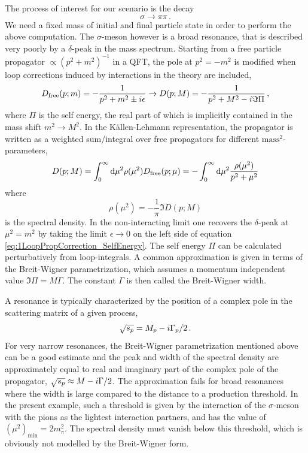 The process of interest for our scenario is the decay
\begin{equation}
    \sigma\to\pi\pi\,.
\end{equation}
We need a fixed mass of initial and final particle state in order to perform the above computation. The $\sigma$-meson however is a broad resonance, that is described very poorly by a $\delta$-peak in the mass spectrum. Starting from a free particle propagator ${\propto(p^2+m^2)^{-1}}$ in a QFT, the pole at ${p^2=-m^2}$ is modified when loop corrections induced by interactions in the theory are included,
\begin{equation}
    D_{\text{free}}(p;m)=-\frac{1}{p^2+m^2\pm{i}\epsilon}\to D(p;M)=-\frac{1}{p^2+M^2-{i}\Im\Pi}\,,
    \label{eq:1LoopPropCorrection_SelfEnergy}
\end{equation}
where $\Pi$ is the self energy, the real part of which is implicitly contained in the mass shift ${m^2\to M^2}$. In the Källen-Lehmann representation, the propagator is written as a weighted sum/integral over free propagators for different $\text{mass}^2$-parameters,
\begin{equation}
    D(p;M)=\int_0^\infty\text{d}\mu^2\rho(\mu^2)D_{\text{free}}(p;\mu)=-\int_0^\infty\text{d}\mu^2\frac{\rho(\mu^2)}{p^2+\mu^2}
\end{equation}
where
\begin{equation}
    \rho(\mu^2)=-\frac{1}{\pi}\Im D(p;M)
\end{equation}
is the spectral density. In the non-interacting limit one recovers the $\delta$-peak at ${\mu^2=m^2}$ by taking the limit ${\epsilon\to 0}$ on the left side of equation \eqref{eq:1LoopPropCorrection_SelfEnergy}. The self energy $\Pi$ can be calculated perturbatively from loop-integrals. A common approximation is given in terms of the Breit-Wigner parametrization, which assumes a momentum independent value ${\Im\Pi=M\Gamma}$. The constant $\Gamma$ is then called the Breit-Wigner width.

A resonance is typically characterized by the position of a complex pole in the scattering matrix of a given process,
\begin{equation}
    \sqrt{s_p}=M_p-{i}\Gamma_p/2\,.
\end{equation}
For very narrow resonances, the Breit-Wigner parametrization mentioned above can be a good estimate and the peak and width of the spectral density are approximately equal to real and imaginary part of the complex pole of the propagator, ${\sqrt{s_p}\approx M-{i}\Gamma/2}$. The approximation fails for broad resonances where the width is large compared to the distance to a production threshold. In the present example, such a threshold is given by the interaction of the $\sigma$-meson with the pions as the lightest interaction partners, and has the value of ${(\mu^2)_{\text{min}}=2m_\pi^2}$. The spectral density must vanish below this threshold, which is obviously not modelled by the Breit-Wigner form.

